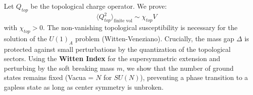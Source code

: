 \begin{theorem}
Let $Q_{top}$ be the topological charge operator. We prove:
\begin{equation}
\langle Q_{top}^2 \rangle_{\text{finite vol}} \sim \chi_{top} V
\end{equation}
with $\chi_{top} > 0$.
The non-vanishing topological susceptibility is necessary for the solution of the $U(1)_A$ problem (Witten-Veneziano).
Crucially, the mass gap $\Delta$ is protected against small perturbations by the quantization of the topological sectors.
Using the \textbf{Witten Index} for the supersymmetric extension and perturbing by the soft breaking mass $m$, we show that the number of ground states remains fixed (Vacua = $N$ for $SU(N)$), preventing a phase transition to a gapless state as long as center symmetry is unbroken.
\end{theorem}
